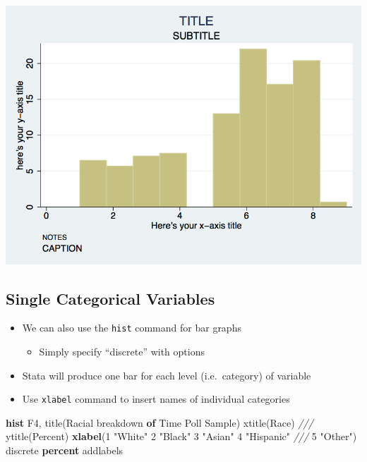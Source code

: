 \documentclass[]{book}
\newenvironment{Shaded}{\begin{snugshade}}{\end{snugshade}}
\newcommand{\BaseNTok}[1]{\textcolor[rgb]{0.00,0.00,0.81}{#1}}
\newcommand{\CommentTok}[1]{\textcolor[rgb]{0.56,0.35,0.01}{\textit{#1}}}
\newcommand{\KeywordTok}[1]{\textcolor[rgb]{0.13,0.29,0.53}{\textbf{#1}}}
\newcommand{\NormalTok}[1]{#1}
\newcommand{\StringTok}[1]{\textcolor[rgb]{0.31,0.60,0.02}{#1}}
\providecommand{\tightlist}{%
  \setlength{\itemsep}{0pt}\setlength{\parskip}{0pt}}
\begin{document}
\includegraphics{Stata/StataModGraph/images/hist2.png}

\hypertarget{single-categorical-variables}{%
\subsection{Single Categorical Variables}\label{single-categorical-variables}}

\begin{itemize}
\tightlist
\item
  We can also use the \texttt{hist} command for bar graphs

  \begin{itemize}
  \tightlist
  \item
    Simply specify ``discrete'' with options
  \end{itemize}
\item
  Stata will produce one bar for each level (i.e.~category) of variable
\item
  Use \texttt{xlabel} command to insert names of individual categories
\end{itemize}

\begin{Shaded}
\begin{Highlighting}[]
  \KeywordTok{hist}\NormalTok{ F4, }\BaseNTok{title}\NormalTok{(Racial breakdown }\KeywordTok{of}\NormalTok{ Time Poll Sample) }\BaseNTok{xtitle}\NormalTok{(Race) }\CommentTok{///}
  \BaseNTok{ytitle}\NormalTok{(Percent) }\KeywordTok{xlabel}\NormalTok{(1 }\StringTok{"White"}\NormalTok{ 2 }\StringTok{"Black"}\NormalTok{ 3 }\StringTok{"Asian"}\NormalTok{ 4 }\StringTok{"Hispanic"} \CommentTok{///}
\NormalTok{   5 }\StringTok{"Other"}\NormalTok{) discrete }\KeywordTok{percent} \BaseNTok{addlabels}
\end{Highlighting}
\end{Shaded}
\end{document}
